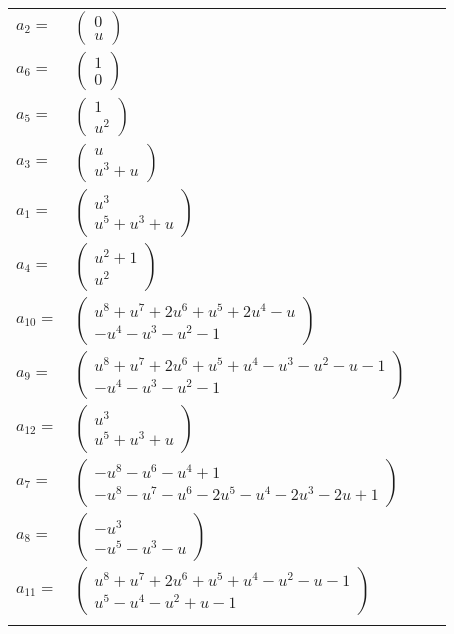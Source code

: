 \documentclass[1p]{elsarticle_modified}
\theoremstyle{definition}
\begin{document}
\begin{tabular}{m{7pt} m{180pt} m{7pt} m{180pt} }
\flushright $a_{2}=$&$\begin{pmatrix}0\\u\end{pmatrix}$ \\
\flushright $a_{6}=$&$\begin{pmatrix}1\\0\end{pmatrix}$ \\
\flushright $a_{5}=$&$\begin{pmatrix}1\\u^2\end{pmatrix}$ \\
\flushright $a_{3}=$&$\begin{pmatrix}u\\u^3+u\end{pmatrix}$ \\
\flushright $a_{1}=$&$\begin{pmatrix}u^3\\u^5+u^3+u\end{pmatrix}$ \\
\flushright $a_{4}=$&$\begin{pmatrix}u^2+1\\u^2\end{pmatrix}$ \\
\flushright $a_{10}=$&$\begin{pmatrix}u^8+u^7+2 u^6+u^5+2 u^4- u\\- u^4- u^3- u^2-1\end{pmatrix}$ \\
\flushright $a_{9}=$&$\begin{pmatrix}u^8+u^7+2 u^6+u^5+u^4- u^3- u^2- u-1\\- u^4- u^3- u^2-1\end{pmatrix}$ \\
\flushright $a_{12}=$&$\begin{pmatrix}u^3\\u^5+u^3+u\end{pmatrix}$ \\
\flushright $a_{7}=$&$\begin{pmatrix}- u^8- u^6- u^4+1\\- u^8- u^7- u^6-2 u^5- u^4-2 u^3-2 u+1\end{pmatrix}$ \\
\flushright $a_{8}=$&$\begin{pmatrix}- u^3\\- u^5- u^3- u\end{pmatrix}$ \\
\flushright $a_{11}=$&$\begin{pmatrix}u^8+u^7+2 u^6+u^5+u^4- u^2- u-1\\u^5- u^4- u^2+u-1\end{pmatrix}$\\&\end{tabular}
\end{document}
